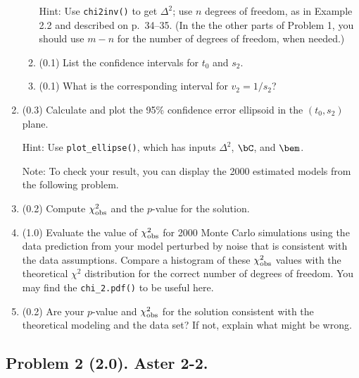 \documentclass[11pt,titlepage,fleqn]{article}
\begin{document}
\begin{enumerate}
\begin{enumerate}
Hint: Use \verb+chi2inv()+ to get $\Delta^2$; use $n$ degrees of freedom, as in Example 2.2 and described on p.~34--35. (In the the other parts of Problem 1, you should use $m-n$ for the number of degrees of freedom, when needed.)

\item (0.1) List the confidence intervals for $t_0$ and $s_2$.
\item (0.1) What is the corresponding interval for $v_2 = 1/s_2$?
\end{enumerate}

\item (0.3) Calculate and plot the 95\% confidence error ellipsoid in the $(t_0, s_2)$ plane.

Hint: Use \verb+plot_ellipse()+, which has inputs $\Delta^2$, $\bC$, and $\bem$.

Note: To check your result, you can display the 2000 estimated models from the following problem.

\item (0.2) Compute $\chi^2_{\rm obs}$ and the $p$-value for the solution.

\item (1.0) Evaluate the value of $\chi^2_{\rm obs}$ for 2000 Monte Carlo simulations using the data prediction from your model perturbed by noise that is consistent with the data assumptions. Compare a histogram of these $\chi^2_{\rm obs}$ values with the theoretical $\chi^2$ distribution for the correct number of degrees of freedom.
You may find the \verb+chi_2.pdf()+ to be useful here.

\label{monte}

\item (0.2) Are your $p$-value and $\chi^2_{\rm obs}$ for the solution consistent with the theoretical modeling and the data set? If not, explain what might be wrong.

\end{enumerate}


\subsection*{Problem 2 (2.0). Aster 2-2.}
\end{document}
